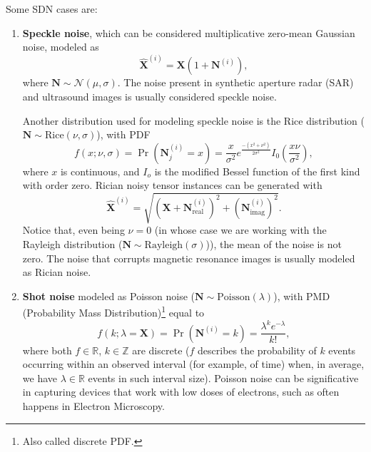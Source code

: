 \documentclass{article}
\begin{document}
Some SDN cases are:
\begin{enumerate}
\item \textbf{Speckle noise}, which can be considered multiplicative
  zero-mean Gaussian noise, modeled as
  \begin{equation}
    \hat{\mathbf X}^{(i)} = {\mathbf X} (1 + {\mathbf N}^{(i)}),
    \label{eq:MGN}
  \end{equation}
  where ${\mathbf N}\sim{\mathcal N}(\mu,\sigma)$. The noise present
  in synthetic aperture radar (SAR) and ultrasound images is usually
  considered speckle noise.

  Another distribution used for modeling speckle noise is the Rice
  distribution ($\mathbf{N}\sim\mathrm{Rice}(\nu,\sigma)$), with PDF
  \begin{equation}
    f(x; \nu,\sigma) = \Pr({\mathbf N}^{(i)}_j{=}x) = \frac{x}{\sigma^2}e^{\frac{-(x^2+\nu^2)}{2\sigma^2}}I_0\left(\frac{x\nu}{\sigma^2}\right),
  \end{equation}
  where $x$ is continuous, and $I_o$ is the modified Bessel function
  of the first kind with order zero. Rician noisy tensor instances can
  be generated with
  \begin{equation}
    \hat{\mathbf X}^{(i)} = \sqrt{ ({\mathbf X} + {\mathbf N}_{\text{real}}^{(i)})^2 + ({\mathbf N}_{\text{imag}}^{(i)})^2}.
  \end{equation}
  Notice that, even being $\nu=0$ (in whose case we are working with
  the Rayleigh distribution
  ($\mathbf{N}\sim\mathrm{Rayleigh}(\sigma)$)), the mean of the noise
  is not zero. The noise that corrupts magnetic resonance images is
  usually modeled as Rician noise.

\item \textbf{Shot noise} modeled as Poisson noise
  ($\mathbf{N}\sim\mathrm{Poisson}(\lambda)$), with PMD (Probability Mass
  Distribution)\footnote{Also called discrete PDF.} equal to
  \begin{equation}
    f(k; \lambda={\mathbf X}) = \Pr({\mathbf N}^{(i)}{=}k) = \frac{\lambda^k e^{-\lambda}}{k!},
    \label{eq:PN}
  \end{equation}
  where both $f\in\mathbb{R}$, $k\in\mathbb{Z}$ are discrete ($f$
  describes the probability of $k$ events occurring within an observed
  interval (for example, of time) when, in average, we have
  $\lambda\in\mathbb{R}$ events in such interval size). Poisson noise
  can be significative in capturing devices that work with low doses
  of electrons, such as often happens in Electron Microscopy.
\end{enumerate}
\end{document}
